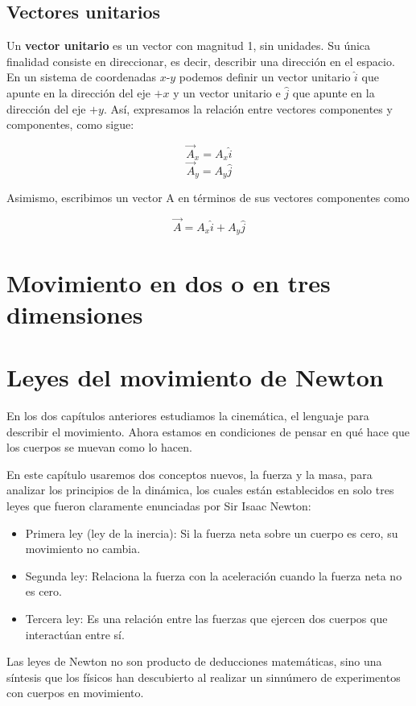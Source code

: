 \documentclass{article}
\newcommand{\newsection}[1]{
    \pagebreak
    {\color{sectionColor}
    \centering
    \section{\bl{#1}}}
    \color{black}
    \vspace{0.5cm}
}
\newcommand{\newsubsection}[1]{
    \vspace{0.5cm}
    \color{sectionColor}
    \subsection{\bl{#1}}
    \color{black}
    \vspace{0.5cm}
}
\newcommand{\bl}[1]{\textbf{#1}}
\begin{document}
    \newsubsection{Vectores unitarios}

    \par Un \bl{vector unitario} es un vector con magnitud 1, sin unidades. Su única ﬁnalidad consiste en direccionar, es decir, describir una dirección en el espacio. En un sistema de coordenadas $x$-$y$ podemos deﬁnir un vector unitario $\hat{i}$ que apunte en la dirección del eje $+x$ y un vector unitario e $\hat{j}$ que apunte en la dirección del eje $+y$. Así, expresamos la relación entre vectores componentes y componentes, como sigue:

    \[ \vec{A}_x = A_x \hat{i} \]
    \[ \vec{A}_y = A_y \hat{j} \]

    Asimismo, escribimos un vector A en términos de sus vectores componentes como

    \[ \vec{A} = A_x \hat{i} + A_y \hat{j} \]

\newsection{Movimiento en dos o en tres dimensiones}


\newsection{Leyes del movimiento de Newton}

\par En los dos capítulos anteriores estudiamos la cinemática, el lenguaje para describir el movimiento. Ahora estamos en condiciones de pensar en qué hace que los cuerpos se muevan como lo hacen.

\par En este capítulo usaremos dos conceptos nuevos, la fuerza y la masa, para analizar los principios de la dinámica, los cuales están establecidos en solo tres leyes que fueron claramente enunciadas por Sir Isaac Newton:

\begin{itemize}
    \item Primera ley (ley de la inercia): Si la fuerza neta sobre un cuerpo es cero, su movimiento no cambia.
    \item Segunda ley: Relaciona la fuerza con la aceleración cuando la fuerza neta no es cero.
    \item Tercera ley: Es una relación entre las fuerzas que ejercen dos cuerpos que interactúan entre sí.
\end{itemize}

\par Las leyes de Newton no son producto de deducciones matemáticas, sino una síntesis que los físicos han descubierto al realizar un sinnúmero de experimentos con cuerpos en movimiento.
\end{document}

